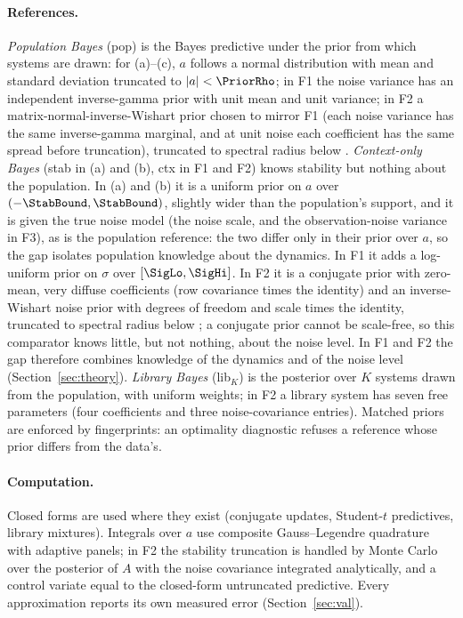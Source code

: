 \paragraph{References.} \emph{Population Bayes} (pop) is the Bayes predictive under the prior from which systems are drawn:
for (a)--(c), $a$ follows a normal distribution with mean \PriorMean and standard deviation \PriorSd truncated to
$|a|<\PriorRho$; in F1 the noise variance has an independent inverse-gamma prior with unit mean and unit variance; in F2 a
matrix-normal-inverse-Wishart prior chosen to mirror F1 (each noise variance has the same inverse-gamma marginal, and at unit
noise each coefficient has the same spread before truncation), truncated to spectral radius below \PriorRho.
\emph{Context-only Bayes} (stab in (a) and (b), ctx in F1 and F2) knows stability but nothing about the population. In (a)
and (b) it is a uniform prior on $a$ over $(-\StabBound,\StabBound)$, slightly wider than the population's support, and it is given
the true noise model (the noise scale, and the observation-noise variance in F3), as is the population reference: the two
differ only in their prior over $a$, so the gap isolates population knowledge about the dynamics. In F1 it adds a
log-uniform prior on $\sigma$ over $[\SigLo,\SigHi]$. In F2 it is a conjugate prior with zero-mean, very diffuse
coefficients (row covariance \FtwoCtxVzero times the identity) and an inverse-Wishart noise prior with \FtwoCtxNu degrees of
freedom and scale \FtwoCtxPsi times the identity, truncated to spectral radius below \StabBound; a conjugate prior cannot be
scale-free, so this comparator knows little, but not nothing, about the noise level. In F1 and F2 the gap therefore combines
knowledge of the dynamics and of the noise level (Section~\ref{sec:theory}). \emph{Library Bayes} (lib$_K$) is the posterior
over $K$ systems drawn from the population, with uniform weights; in F2 a library system has seven free parameters (four
coefficients and three noise-covariance entries). Matched priors are enforced by fingerprints: an optimality diagnostic
refuses a reference whose prior differs from the data's.

\paragraph{Computation.} Closed forms are used where they exist (conjugate updates, Student-$t$ predictives, library
mixtures). Integrals over $a$ use composite Gauss--Legendre quadrature with adaptive panels; in F2 the stability truncation
is handled by Monte Carlo over the posterior of $A$ with the noise covariance integrated analytically, and a control
variate equal to the closed-form untruncated predictive. Every approximation reports its own measured error
(Section~\ref{sec:val}).
